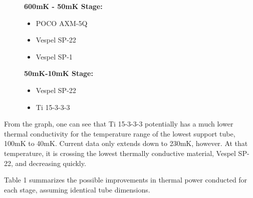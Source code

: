 \documentclass{report}
\begin{document}
\begin{multicols}{2}
\begin{figure}[htb]
\begin{minipage}[t]{.3\textwidth}
\begin{itemize}
\end{itemize}
\end{minipage}
\begin{minipage}[t]{.3\textwidth}
\textbf{600mK - 50mK Stage:}
\begin{itemize}
\item POCO AXM-5Q
\item Vespel SP-22
\item Vespel SP-1
\end{itemize}
\end{minipage}
\begin{minipage}[t]{.3\textwidth}
\textbf{50mK-10mK Stage:}
\begin{itemize}
\item Vespel SP-22
\item Ti 15-3-3-3
\end{itemize}
\end{minipage}
\end{figure}

From the graph, one can see that Ti 15-3-3-3 potentially has a much lower thermal
conductivity for the temperature range of the lowest support tube, 100mK to 40mK.
Current data only extends down to 230mK, however. At that temperature, it is crossing
the lowest thermally conductive material, Vespel SP-22, and decreasing quickly.

Table 1 summarizes the possible improvements in thermal power conducted for each stage,
assuming identical tube dimensions.


\end{multicols}
\end{document}
